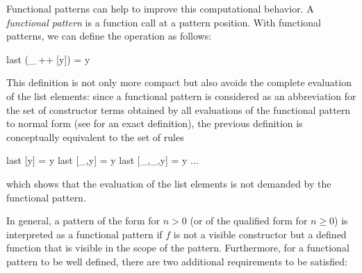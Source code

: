 Functional patterns can help to improve this computational behavior.
A \emph{functional pattern}
is a function call at a pattern position. With functional patterns,
we can define the operation  as follows:
\begin{curry}
last (_$\;$++$\;$[y]) = y
\end{curry}
This definition is not only more compact but also avoids the complete
evaluation of the list elements: since a functional pattern is considered
as an abbreviation for the set of constructor terms obtained by all
evaluations of the functional pattern to normal form (see
\cite{AntoyHanus05LOPSTR} for an exact definition), the previous
definition is conceptually equivalent to the set of rules
\begin{curry}
last [y] = y
last [_,y] = y
last [_,_,y] = y
$\ldots$
\end{curry}
which shows that the evaluation of the list elements is not demanded
by the functional pattern.

In general, a pattern of the form  for $n>0$
(or of the qualified form  for $n \geq 0$)
is interpreted as a functional pattern if $f$ is not a visible constructor
but a defined function that is visible in the scope of the pattern.
Furthermore, for a functional pattern to be well defined,
there are two additional requirements to be satisfied:

